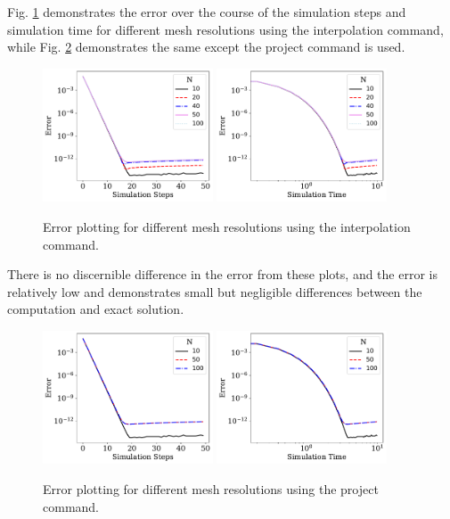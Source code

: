 \documentclass[12pt,3p]{article}
\begin{document}
Fig. \ref{FigCompErrorInt} demonstrates the error over the course of the simulation steps and simulation time for different mesh resolutions using the {\selectfont
interpolation} command, while Fig. \ref{FigCompErrorProj} demonstrates the same except the {\selectfont project} command is used. 

\begin{figure}[!htb]
\centering
\includegraphics[width=0.45\textwidth]{./Images/CompIntSimSteps}
\includegraphics[width=0.45\textwidth]{./Images/CompIntSimTime}
\caption{ Error plotting for different mesh resolutions using the interpolation command.}
\label{FigCompErrorInt}
\end{figure}

There is no discernible difference in the error from these plots, and the error is relatively low and demonstrates small but negligible differences between the computation and exact solution. 

\begin{figure}[!htb]
\centering
\includegraphics[width=0.45\textwidth]{./Images/CompProjSimSteps}
\includegraphics[width=0.45\textwidth]{./Images/CompProjSimtime}
\caption{ Error plotting for different mesh resolutions using the project command.}
\label{FigCompErrorProj}
\end{figure}
\end{document}

